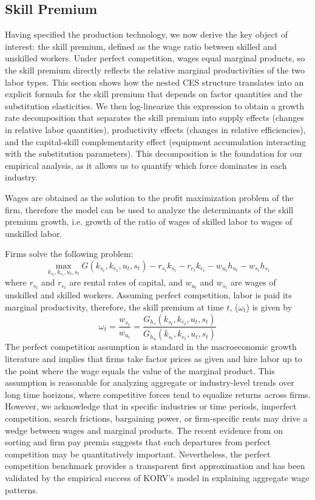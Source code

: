 \documentclass[12pt]{article}
\begin{document}
\subsection{Skill Premium}

Having specified the production technology, we now derive the key object of interest: the skill premium, defined as the wage ratio between skilled and unskilled workers. Under perfect competition, wages equal marginal products, so the skill premium directly reflects the relative marginal productivities of the two labor types. This section shows how the nested CES structure translates into an explicit formula for the skill premium that depends on factor quantities and the substitution elasticities. We then log-linearize this expression to obtain a growth rate decomposition that separates the skill premium into supply effects (changes in relative labor quantities), productivity effects (changes in relative efficiencies), and the capital-skill complementarity effect (equipment accumulation interacting with the substitution parameters). This decomposition is the foundation for our empirical analysis, as it allows us to quantify which force dominates in each industry.

Wages are obtained as the solution to the profit maximization problem of the firm, therefore the model can be used to analyze the determinants of the skill premium growth, i.e. growth of the ratio of wages of skilled labor to wages of unskilled labor. 

Firms solve the following problem:
\begin{equation}\label{eq:profit_max}
 \max_{k_{s_t}, k_{e_t}, u_t, s_t} G(k_{s_t}, k_{e_t}, u_t, s_t) - r_{s_t}k_{s_t} - r_{e_t}k_{e_t} - w_{u_t} h_{u_t} - w_{s_t} h_{s_t}
\end{equation}
where $r_{s_t}$ and $r_{e_t}$ are rental rates of capital, and $w_{u_t}$ and $w_{s_t}$ are wages of unskilled and skilled workers. Assuming perfect competition, labor is paid its marginal productivity, therefore, the skill premium at time $t$, ($\omega_t$) is given by
\begin{equation}
 \omega_t = \frac{w_{s_t}}{w_{u_t}} = \frac{G_{h_s}(k_{s_t}, k_{e_t}, u_t, s_t) }{G_{h_u}(k_{s_t}, k_{e_t}, u_t, s_t) }
\end{equation}
The perfect competition assumption is standard in the macroeconomic growth literature and implies that firms take factor prices as given and hire labor up to the point where the wage equals the value of the marginal product. This assumption is reasonable for analyzing aggregate or industry-level trends over long time horizons, where competitive forces tend to equalize returns across firms. However, we acknowledge that in specific industries or time periods, imperfect competition, search frictions, bargaining power, or firm-specific rents may drive a wedge between wages and marginal products. The recent evidence from \citet{song2019firming} on sorting and firm pay premia suggests that such departures from perfect competition may be quantitatively important. Nevertheless, the perfect competition benchmark provides a transparent first approximation and has been validated by the empirical success of KORV's model in explaining aggregate wage patterns.
\end{document}
